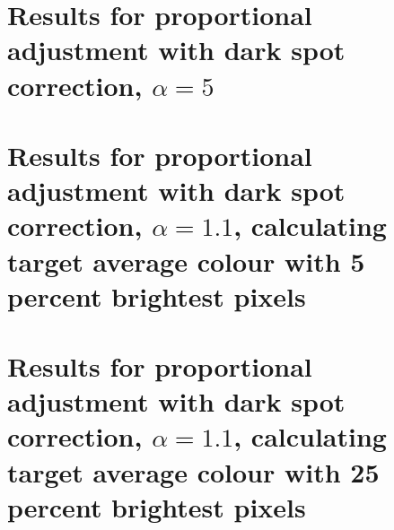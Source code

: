 \documentclass[12pt, a4paper]{article}
\begin{document}
\section{Results for proportional adjustment with dark spot correction, $\alpha = 5$}\label{app:prop_corr_ave_a5}


\section{Results for proportional adjustment with dark spot correction, $\alpha = 1.1$, calculating target average colour with 5 percent brightest pixels}\label{app:prop_corr_ave_a1p1_perc5}


\section{Results for proportional adjustment with dark spot correction, $\alpha = 1.1$, calculating target average colour with 25 percent brightest pixels}\label{app:prop_corr_ave_a1p1_perc25}

\end{document}
